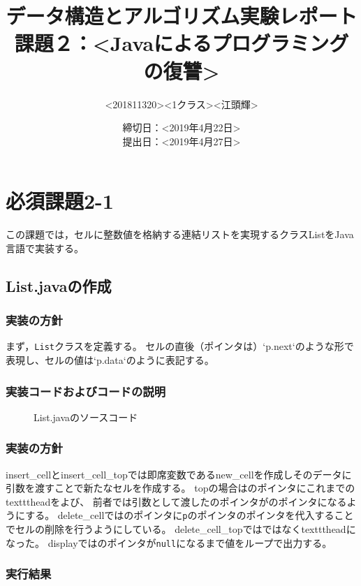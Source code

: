 \documentclass[10.5pt,a4paper]{jsarticle}
\title{データ構造とアルゴリズム実験レポート\\課題２：\textless Javaによるプログラミングの復讐\textgreater}
\author{\textless 201811320\textgreater \textless 1クラス\textgreater \textless 江頭輝\textgreater}
\date{締切日：\textless 2019年4月22日\textgreater\\提出日：\textless 2019年4月27日\textgreater}
\begin{document}
\maketitle

\section{必須課題2-1}

この課題では，セルに整数値を格納する連結リストを実現するクラスListをJava言語で実装する。

\subsection{List.javaの作成}
\subsubsection{実装の方針}
まず，\texttt{List}クラスを定義する。
セルの直後（ポインタは）`p.next`のような形で表現し、セルの値は`p.data`のように表記する。

\subsubsection{実装コードおよびコードの説明}

\begin{figure}[t]
  \begin{center}
   
   \caption{List.javaのソースコード}
  \end{center}
\end{figure}

\subsubsection{実装の方針}
insert\_cellとinsert\_cell\_topでは即席変数であるnew\_cellを作成しそのデータに引数を渡すことで新たなセルを作成する。
topの場合はのポインタにこれまでのtexttt{head}をよび、
前者では引数として渡したのポインタがのポインタになるようにする。
delete\_cellではのポインタに\texttt{p}のポインタのポインタを代入することでセルの削除を行うようにしている。
delete\_cell\_topではではなくtexttt{head}になった。
displayではのポインタが\texttt{null}になるまで値をループで出力する。


\subsubsection{実行結果}\label{sec:ls_code_exec}
\end{document}
